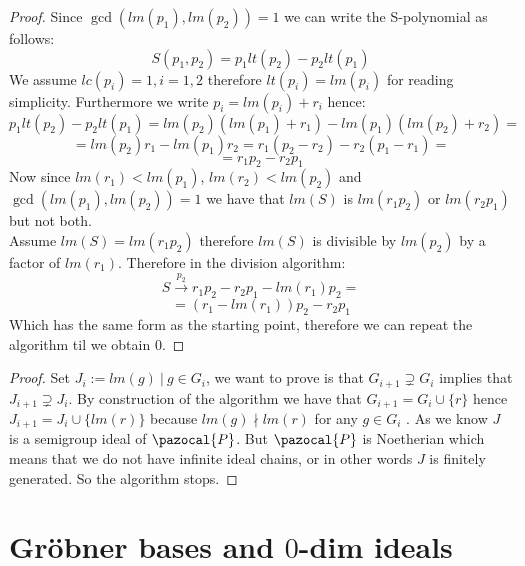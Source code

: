 \documentclass[11pt,a4paper]{report}
\theoremstyle{plain}
\theoremstyle{definition}
\newcommand{\Po}{\pazocal{P}}
\begin{document}
\begin{lem-hand}[2.2.13]
\end{lem-hand}
\begin{proof}
	Since $\gcd(lm(p_1),lm(p_2)) = 1$ we can write the S-polynomial as follows:
	\[
		S(p_1, p_2) = p_1lt(p_2) - p_2lt(p_1)
	\]
	We assume $lc(p_i) = 1, i = 1,2$ therefore $lt(p_i) = lm(p_i)$ for reading simplicity. Furthermore we write $p_i = lm(p_i) + r_i$ hence:
	\[
		p_1lt(p_2) - p_2lt(p_1) = lm(p_2)(lm(p_1) + r_1) - lm(p_1)(lm(p_2) + r_2) =
	\]
	\[
		= lm(p_2)r_1 - lm(p_1)r_2 = r_1(p_2 - r_2) - r_2(p_1 - r_1) =
	\]
	\[
		= r_1p_2 - r_2p_1	
	\]
	Now since $lm(r_1) < lm(p_1)$, $lm(r_2) < lm(p_2)$ and $\gcd(lm(p_1),lm(p_2)) = 1$ we have that $lm(S)$ is $lm(r_1p_2)$ or $lm(r_2p_1)$ but not both.\\
	Assume $lm(S) = lm(r_1p_2)$ therefore $lm(S)$ is divisible by $lm(p_2)$ by a factor of $lm(r_1)$. Therefore in the division algorithm:
	\[
		S \xrightarrow{p_2}  r_1p_2 - r_2p_1 - lm(r_1)p_2 = 	
	\]
	\[
		= (r_1 - lm(r_1))p_2 - r_2p_1	
	\]
	Which has the same form as the starting point, therefore we can repeat the algorithm til we obtain $0$.
\end{proof}

\begin{prop-hand}[2.2.14]
\end{prop-hand}
\begin{proof}
	Set $J_i := {lm(g)\ |\ g \in G_i}$, we want to prove is that $G_{i+1} \supsetneq G_i$ implies that $J_{i+1} \supsetneq J_i$. By construction of the algorithm we have that $G_{i+1} = G_i \cup \{r\}$ hence $J_{i+1} = J_i \cup \{lm(r)\}$ because $lm(g) \nmid lm(r)$ for any $g \in G_i$ . As we know $J$ is a semigroup ideal of $\Po$. But $\Po$ is Noetherian which means that we do not have infinite ideal chains, or in other words $J$ is finitely generated. So the algorithm stops.
\end{proof}

\chapter{Gr\"obner bases and $0$-dim ideals}
\end{document}
